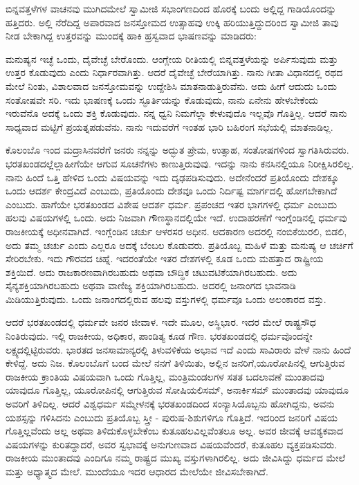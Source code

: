 ಬಿನ್ನವತ್ತಳೆಗಳ ವಾಚನವು ಮುಗಿದಮೇಲೆ ಸ್ವಾಮೀಜಿ ಸಭಾಂಗಣದಿಂದ ಹೊರಕ್ಕೆ ಬಂದು ಅಲ್ಲಿದ್ದ ಗಾಡಿಯೊಂದನ್ನು ಹತ್ತಿದರು. ಅಲ್ಲಿ ನೆರೆದಿದ್ದ ಅಪಾರವಾದ ಜನಸ್ತೋಮದ ಉತ್ಸಾಹವು ಉಕ್ಕಿ ಹರಿಯುತ್ತಿದ್ದುದರಿಂದ ಸ್ವಾಮೀಜಿ ತಾವು ನೀಡ ಬೇಕಾಗಿದ್ದ ಉತ್ತರವನ್ನು ಮುಂದಕ್ಕೆ ಹಾಕಿ ಹ್ರಸ್ವವಾದ ಭಾಷಣವನ್ನು ಮಾಡಿದರು:

ಮನುಷ್ಯನ ಇಚ್ಛೆ ಒಂದು, ದೈವೇಚ್ಛೆ ಬೇರೊಂದು. ಆಂಗ್ಲೇಯ ರೀತಿಯಲ್ಲಿ ಬಿನ್ನವತ್ತಳೆಯನ್ನು ಅರ್ಪಿಸುವುದು ಮತ್ತು ಉತ್ತರ ಕೊಡುವುದು ಎಂದು ನಿರ್ಧಾರವಾಗಿತ್ತು. ಆದರೆ ದೈವೇಚ್ಛೆ ಬೇರೆಯಾಗಿತ್ತು. ನಾನು ಗೀತಾ ವಿಧಾನದಲ್ಲಿ ರಥದ ಮೇಲೆ ನಿಂತು, ವಿಶಾಲವಾದ ಜನಸ್ತೋಮವನ್ನು ಉದ್ದೇಶಿಸಿ ಮಾತನಾಡುತ್ತಿರುವೆನು. ಅದು ಹೀಗೆ ಆದುದು ಒಂದು ಸಂತೋಷವೇ ಸರಿ. ಇದು ಭಾಷಣಕ್ಕೆ ಒಂದು ಸ್ಫೂರ್ತಿಯನ್ನು ಕೊಡುವುದು, ನಾನು ಏನೇನು ಹೇಳಬೇಕೆಂದು ಇರುವೆನೊ ಅದಕ್ಕೆ ಒಂದು ಶಕ್ತಿ ಕೊಡುವುದು. ನನ್ನ ಧ್ವನಿ ನಿಮಗೆಲ್ಲಾ ಕೇಳುವುದೊ ಇಲ್ಲವೊ ಗೊತ್ತಿಲ್ಲ. ಆದರೆ ನಾನು ಸಾಧ್ಯವಾದ ಮಟ್ಟಿಗೆ ಪ್ರಯತ್ನಪಡುವೆನು. ನಾನು ಇದುವರೆಗೆ ಇಂತಹ ಭಾರಿ ಬಹಿರಂಗ ಸಭೆಯಲ್ಲಿ ಮಾತನಾಡಿಲ್ಲ.

ಕೊಲಂಬೊ ಇಂದ ಮದ್ರಾಸಿನವರೆಗೆ ಜನರು ನನ್ನನ್ನು ಅದ್ಭುತ ಪ್ರೇಮ, ಉತ್ಸಾಹ, ಸಂತೋಷಗಳಿಂದ ಸ್ವಾಗತಿಸಿರುವರು. ಭರತಖಂಡದಲ್ಲೆಲ್ಲಾ\break ಹೀಗೆಯೇ ಆಗುವ ಸೂಚನೆಗಳು ಕಾಣುತ್ತಿರುವುವು. ಇದನ್ನು ನಾನು ಕನಸಿನಲ್ಲಿಯೂ ನಿರೀಕ್ಷಿಸಿರಲಿಲ್ಲ. ನಾನು ಹಿಂದೆ ಒತ್ತಿ ಹೇಳಿದ ಒಂದು ವಿಷಯವನ್ನು ಇದು ದೃಢಪಡಿಸುವುದು. ಅದೇನೆಂದರೆ ಪ್ರತಿಯೊಂದು ದೇಶಕ್ಕೂ ಒಂದು ಆದರ್ಶ ಕೇಂದ್ರವಿದೆ ಎಂಬುದು, ಪ್ರತಿಯೊಂದು ದೇಶವೂ ಒಂದು ನಿರ್ದಿಷ್ಟ ಮಾರ್ಗದಲ್ಲಿ ಹೋಗಬೇಕಾಗಿದೆ ಎಂಬುದು. ಹಾಗೆಯೇ ಭರತಖಂಡದ ವಿಶೇಷ ಆದರ್ಶ ಧರ್ಮ. ಪ್ರಪಂಚದ ಇತರ ಭಾಗಗಳಲ್ಲಿ ಧರ್ಮ ಎಂಬುದು ಹಲವು ವಿಷಯಗಳಲ್ಲಿ ಒಂದು. ಅದು ನಿಜವಾಗಿ ಗೌಣಸ್ಥಾನದಲ್ಲಿಯೇ ಇದೆ. ಉದಾಹರಣೆಗೆ ಇಂಗ್ಲೆಂಡಿನಲ್ಲಿ ಧರ್ಮವು ರಾಜಕೀಯಕ್ಕೆ ಅಧೀನವಾಗಿದೆ. ಇಂಗ್ಲೆಂಡಿನ ಚರ್ಚು ಆಳರಸರ ಅಧೀನ. ಆದಕಾರಣ ಅದರಲ್ಲಿ ನಂಬಿಕೆಯಿರಲಿ, ಬಿಡಲಿ, ಅದು ತಮ್ಮ ಚರ್ಚು ಎಂದು ಎಲ್ಲರೂ ಅದಕ್ಕೆ ಬೆಂಬಲ ಕೊಡುವರು. ಪ್ರತಿಯೊಬ್ಬ ಮಹಿಳೆ ಮತ್ತು ಮನುಷ್ಯ ಆ ಚರ್ಚಿಗೆ ಸೇರಿರಬೇಕು. ಇದು ಗೌರವದ ಚಿಹ್ನೆ. ಇದರಂತೆಯೇ ಇತರ ದೇಶಗಳಲ್ಲಿ ಕೂಡ ಒಂದು ಮಹತ್ತಾದ ರಾಷ್ಟ್ರೀಯ ಶಕ್ತಿಯಿದೆ. ಅದು ರಾಜಕಾರಣವಾಗಿರಬಹುದು ಅಥವಾ ಬೌದ್ಧಿಕ ಚಟುವಟಿಕೆಯಾಗಿರಬಹುದು. ಅದು ಸೈನ್ಯಶಕ್ತಿಯಾಗಿರಬಹುದು ಅಥವಾ ವಾಣಿಜ್ಯ ಶಕ್ತಿಯಾಗಿರಬಹುದು. ಅದರಲ್ಲಿ ಜನಾಂಗದ ಭಾವನಾಡಿ ಮಿಡಿಯುತ್ತಿರುವುದು. ಒಂದು ಜನಾಂಗದಲ್ಲಿರುವ ಹಲವು ವಸ್ತುಗಳಲ್ಲಿ ಧರ್ಮವೂ ಒಂದು ಅಲಂಕಾರದ ವಸ್ತು.

ಆದರೆ ಭರತಖಂಡದಲ್ಲಿ ಧರ್ಮವೇ ಜನರ ಜೀವಾಳ. ಇದೇ ಮೂಲ, ಅಸ್ಥಿಭಾರ. ಇದರ ಮೇಲೆ ರಾಷ್ಟ್ರಸೌಧ ನಿಂತಿರುವುದು. ಇಲ್ಲಿ ರಾಜಕೀಯ, ಅಧಿಕಾರ, ಪಾಂಡಿತ್ಯ ಕೂಡ ಗೌಣ. ಭರತಖಂಡದಲ್ಲಿ ಧರ್ಮವೊಂದನ್ನೇ ಲಕ್ಷ್ಯದಲ್ಲಿಟ್ಟಿರುವರು. ಭಾರತದ ಜನಸಾಮಾನ್ಯರಲ್ಲಿ ತಿಳುವಳಿಕೆಯ ಅಭಾವ ಇದೆ ಎಂದು ಸಾವಿರಾರು ವೇಳೆ ನಾನು ಹಿಂದೆ ಕೇಳಿದ್ದೆ. ಅದು ನಿಜ. ಕೊಲಂಬೊಗೆ ಬಂದ ಮೇಲೆ ನನಗೆ ತಿಳಿಯಿತು, ಅಲ್ಲಿನ ಜನರಿಗೆ,\break ಯೂರೋಪಿನಲ್ಲಿ ಆಗುತ್ತಿರುವ ರಾಜಕೀಯ ಕ್ರಾಂತಿಯ ವಿಷಯವಾಗಿ ಒಂದು ಗೊತ್ತಿಲ್ಲ, ಮಂತ್ರಿಮಂಡಲಗಳ ಸತತ ಬದಲಾವಣೆ ಮುಂತಾದವು ಯಾವುದೂ ಗೊತ್ತಿಲ್ಲ, ಯೂರೋಪಿನಲ್ಲಿ ಆಗುತ್ತಿರುವ ಸೋಷಿಯಲಿಸಮ್​, ಅನಾರ್ಕಿಸಮ್​ ಮುಂತಾದವು ಯಾವುದೂ ಅವರಿಗೆ ತಿಳಿದಿಲ್ಲ. ಆದರೆ ವಿಶ್ವಧರ್ಮ ಸಮ್ಮೇಳನಕ್ಕೆ ಭರತಖಂಡದಿಂದ ಸಂನ್ಯಾಸಿಯೊಬ್ಬನು ಹೋಗಿದ್ದನು, ಅವನು ಯಶಸ್ಸನ್ನು ಗಳಿಸಿದನು ಎಂಬುದು ಪ್ರತಿಯೊಬ್ಬ ಸ್ತ್ರೀ - ಪುರುಷ-ಶಿಶುಗಳಿಗೂ ಗೊತ್ತಿದೆ. ಇದರಿಂದ ಜನರಿಗೆ ವಿಷಯ ಗೊತ್ತಿಲ್ಲವೆಂದು ಅಲ್ಲ ಅಥವಾ ತಿಳಿದುಕೊಳ್ಳಬೇಕೆಂಬ ಕುತೂಹಲವಿಲ್ಲವೆಂತಲೂ ಅಲ್ಲ. ಅವರ ಜೀವಕ್ಕೆ ಆವಶ್ಯಕವಾದ ವಿಷಯಗಳನ್ನು ಕುರಿತದ್ದಾದರೆ, ಅವರ ಸ್ವಭಾವಕ್ಕೆ ಅನುಗುಣವಾದ ವಿಷಯವೆಂದರೆ, ಕುತೂಹಲ ವ್ಯಕ್ತಪಡಿಸುವರು. ರಾಜಕೀಯ ಮುಂತಾದವು ಎಂದಿಗೂ ನಮ್ಮ ರಾಷ್ಟ್ರದ ಮುಖ್ಯ ವಸ್ತುಗಳಾಗಿರಲಿಲ್ಲ. ಅದು ಜೀವಿಸಿದ್ದು ಧರ್ಮದ ಮೇಲೆ ಮತ್ತು ಅಧ್ಯಾತ್ಮದ ಮೇಲೆ. ಮುಂದೆಯೂ ಇದರ ಆಧಾರದ ಮೇಲೆಯೇ ಜೀವಿಸಬೇಕಾಗಿದೆ.


